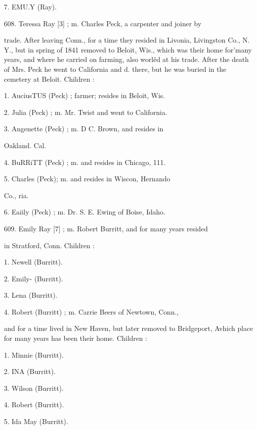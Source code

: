 \documentclass{book}
\begin{document}
7. EMU.Y (Ray). 

608. Teressa Ray [3] ; m. Charles Peck, a carpenter and joiner by 

trade. After leaving Conn., for a time they resided in Livonia, 
Livingston Co., N. Y., but in spring of 1841 removed to Beloit, 
Wis., which was their home for'many years, and where he 
carried on farming, also worl\^ed at his trade. After the 
death of Mrs. Peck he went to California and d. there, but he 
was buried in the cemetery at Beloit. Children : 

1. AuciusTUS (Peck) ; farmer; resides in Beloit, Wis. 

2. Julia (Peck) ; m. Mr. Twist and went to California. 

3. Angenette (Peck) ; m. D C. Brown, and resides in 

Oakland. Cal. 

4. BuRRiTT (Peck) ; m. and resides in Chicago, 111. 

5. Charles (Peck); m. and resides in Wiscon, Hernando 

Co., ria. 

6. Eaiily (Peck) ; m. Dr. S. E. Ewing of Boise, Idaho. 

609. Emily Ray [7] ; m. Robert Burritt, and for many years resided 

in Stratford, Conn. Children : 

1. Newell (Burritt). 

2. Emily- (Burritt). 

3. Lena (Burritt). 

4. Robert (Burritt) ; m. Carrie Beers of Newtown, Conn., 

and for a time lived in New Haven, but later removed 
to Bridgeport, Avhich place for many years has been 
their home. Children : 

1. Minnie (Burritt). 

2. INA (Burritt). 

3. Wilson (Burritt). 

4. Robert (Burritt). 

5. Ida May (Burritt). 
\end{document}
